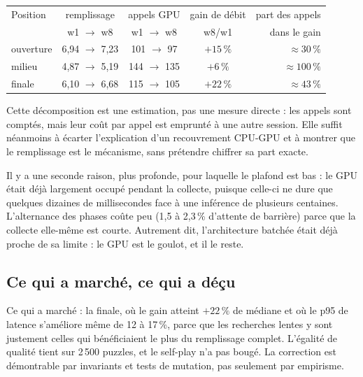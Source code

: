\begin{center}
\small
\begin{tabular}{lcccr}
\toprule
Position & remplissage & appels GPU & gain de d\'ebit & part des appels \\
         & w1 $\to$ w8 & w1 $\to$ w8 & w8/w1 & dans le gain \\
\midrule
ouverture & 6,94 $\to$ 7,23 & 101 $\to$ 97   & $+15\,\%$ & $\approx 30\,\%$ \\
milieu    & 4,87 $\to$ 5,19 & 144 $\to$ 135 & $+6\,\%$  & $\approx 100\,\%$ \\
finale    & 6,10 $\to$ 6,68 & 115 $\to$ 105 & $+22\,\%$ & $\approx 43\,\%$ \\
\bottomrule
\end{tabular}
\label{tab:decomposition}
\end{center}

Cette d\'ecomposition est une estimation, pas une mesure directe : les
appels sont compt\'es, mais leur co\^ut par appel est emprunt\'e \`a une autre
session. Elle suffit n\'eanmoins \`a \'ecarter l'explication d'un recouvrement
CPU-GPU et \`a montrer que le remplissage est le m\'ecanisme, sans pr\'etendre
chiffrer sa part exacte.

Il y a une seconde raison, plus profonde, pour laquelle le plafond est bas :
le GPU \'etait d\'ej\`a largement occup\'e pendant la collecte, puisque celle-ci
ne dure que quelques dizaines de millisecondes face \`a une inf\'erence de
plusieurs centaines. L'alternance des phases co\^ute peu (1,5 \`a 2,3\,\%
d'attente de barri\`ere) parce que la collecte elle-m\^eme est courte. Autrement
dit, l'architecture batch\'ee \'etait d\'ej\`a proche de sa limite : le GPU est
le goulot, et il le reste.

\subsection{Ce qui a march\'e, ce qui a d\'e\c{c}u}

Ce qui a march\'e : la finale, o\`u le gain atteint $+22\,\%$ de m\'ediane et
o\`u le p95 de latence s'am\'eliore m\^eme de 12 \`a 17\,\%, parce que les
recherches lentes y sont justement celles qui b\'en\'eficiaient le plus du
remplissage complet. L'\'egalit\'e de qualit\'e tient sur 2\,500 puzzles, et
le self-play n'a pas boug\'e. La correction est d\'emontrable par invariants
et tests de mutation, pas seulement par empirisme.

